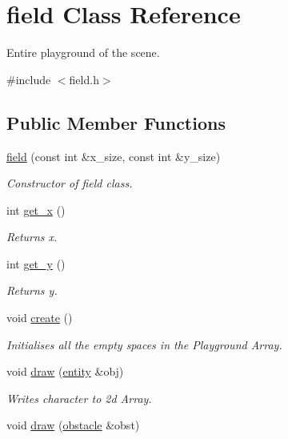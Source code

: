 \hypertarget{classfield}{}\section{field Class Reference}
\label{classfield}


Entire playground of the scene.  




{\ttfamily \#include $<$field.\+h$>$}

\subsection*{Public Member Functions}
\begin{DoxyCompactItemize}
\item 
\hyperlink{classfield_aed35371ff99892965f46835a32b57c41}{field} (const int \&x\+\_\+size, const int \&y\+\_\+size)
\begin{DoxyCompactList}\small\item\em Constructor of field class. \end{DoxyCompactList}\item 
int \hyperlink{classfield_a87f95797eadbc2b60276d4503383bef0}{get\+\_\+x} ()
\begin{DoxyCompactList}\small\item\em Returns x. \end{DoxyCompactList}\item 
int \hyperlink{classfield_aa5aad6f7a49d4265ec8c482030553a18}{get\+\_\+y} ()
\begin{DoxyCompactList}\small\item\em Returns y. \end{DoxyCompactList}\item 
void \hyperlink{classfield_acebf59882faff84102c239ac6ab63a09}{create} ()
\begin{DoxyCompactList}\small\item\em Initialises all the empty spaces in the Playground Array. \end{DoxyCompactList}\item 
void \hyperlink{classfield_a25b067a824200a97e2795a063b440684}{draw} (\hyperlink{classentity}{entity} \&obj)
\begin{DoxyCompactList}\small\item\em Writes character to 2d Array. \end{DoxyCompactList}\item 
void \hyperlink{classfield_aa52bcbf98c07608197780e1e6cdfaab5}{draw} (\hyperlink{classobstacle}{obstacle} \&obst)

\end{DoxyCompactItemize}
